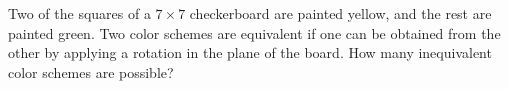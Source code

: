 Two of the squares of a $ 7\times 7$ checkerboard are painted yellow, and the rest are painted green.  Two color schemes are equivalent if one can be obtained from the other by applying a rotation in the plane of the board.  How many inequivalent color schemes are possible?